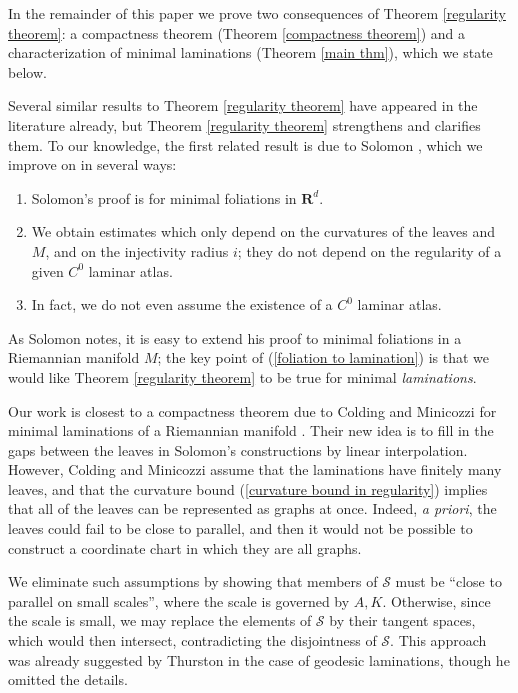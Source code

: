 \documentclass[reqno,11pt]{amsart}
\newcommand{\RR}{\mathbf{R}}
\theoremstyle{definition}
\numberwithin{equation}{section}
\begin{document}
In the remainder of this paper we prove two consequences of Theorem \ref{regularity theorem}: a compactness theorem (Theorem \ref{compactness theorem}) and a characterization of minimal laminations (Theorem \ref{main thm}), which we state below.

Several similar results to Theorem \ref{regularity theorem} have appeared in the literature already, but Theorem \ref{regularity theorem} strengthens and clarifies them.
To our knowledge, the first related result is due to Solomon \cite[Theorem 1.1]{Solomon86}, which we improve on in several ways:
\begin{enumerate}
\item \label{foliation to lamination} Solomon's proof is for minimal foliations in $\RR^d$.
\item We obtain estimates which only depend on the curvatures of the leaves and $M$, and on the injectivity radius $i$; they do not depend on the regularity of a given $C^0$ laminar atlas.
\item In fact, we do not even assume the existence of a $C^0$ laminar atlas.
\end{enumerate}
As Solomon notes, it is easy to extend his proof to minimal foliations in a Riemannian manifold $M$; the key point of (\ref{foliation to lamination}) is that we would like Theorem \ref{regularity theorem} to be true for minimal \emph{laminations}.

Our work is closest to a compactness theorem due to Colding and Minicozzi for minimal laminations of a Riemannian manifold \cite[Appendix B]{ColdingMinicozziIV}.
Their new idea is to fill in the gaps between the leaves in Solomon's constructions by linear interpolation.
However, Colding and Minicozzi assume that the laminations have finitely many leaves, and that the curvature bound (\ref{curvature bound in regularity}) implies that all of the leaves can be represented as graphs at once.
Indeed, \emph {a priori}, the leaves could fail to be close to parallel, and then it would not be possible to construct a coordinate chart in which they are all graphs.

We eliminate such assumptions by showing that members of $\mathcal S$ must be ``close to parallel on small scales'', where the scale is governed by $A, K$.
Otherwise, since the scale is small, we may replace the elements of $\mathcal S$ by their tangent spaces, which would then intersect, contradicting the disjointness of $\mathcal S$.
This approach was already suggested by Thurston \cite[\S8.5]{thurston1979geometry} in the case of geodesic laminations, though he omitted the details. 
\end{document}
